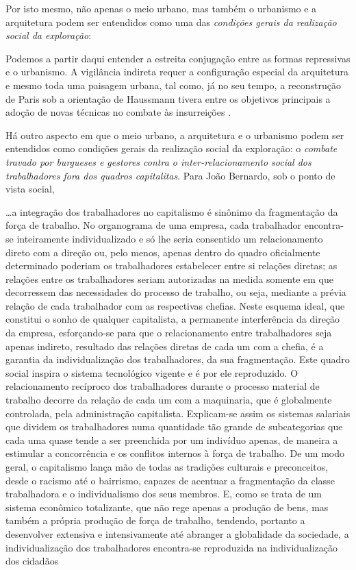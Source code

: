 Por isto mesmo, não apenas o meio urbano, mas também o urbanismo e a arquitetura podem ser entendidos como uma das \textit{condições gerais da realização social da exploração}:

\begin{citacao}
Podemos a partir daqui entender a estreita conjugação entre as formas repressivas e o urbanismo. A vigilância indireta requer a configuração especial da arquitetura e mesmo toda uma paisagem urbana, tal como, já no seu tempo, a reconstrução de Paris sob a orientação de Haussmann tivera entre os objetivos principais a adoção de novas técnicas no combate às insurreições \cite[p.~160]{BERNARDO1991}.
\end{citacao}

Há outro aspecto em que o meio urbano, a arquitetura e o urbanismo podem ser entendidos como condições gerais da realização social da exploração: o \textit{combate travado por burgueses e gestores contra o inter-relacionamento social dos trabalhadores fora dos quadros capitalitas}. Para João Bernardo, sob o ponto de vista social,

\begin{citacao}
\dots a integração dos trabalhadores no capitalismo é sinônimo da fragmentação da força de trabalho. No organograma de uma empresa, cada trabalhador encontra-se inteiramente individualizado e só lhe seria consentido um relacionamento direto com a direção ou, pelo menos, apenas dentro do quadro oficialmente determinado poderiam os trabalhadores estabelecer entre si relações diretas; as relações entre os trabalhadores seriam autorizadas na medida somente em que decorressem das necessidades do processo de trabalho, ou seja, mediante a prévia relação de cada trabalhador com as respectivas chefias. Neste esquema ideal, que constitui o sonho de qualquer capitalista, a permanente interferência da direção da empresa, esforçando-se para que o relacionamento entre trabalhadores seja apenas indireto, resultado das relações diretas de cada um com a chefia, é a garantia da individualização dos trabalhadores, da sua fragmentação. Este quadro social inspira o sistema tecnológico vigente e é por ele reproduzido. O relacionamento recíproco dos trabalhadores durante o processo material de trabalho decorre da relação de cada um com a maquinaria, que é globalmente controlada, pela administração capitalista. Explicam-se assim os sistemas salariais que dividem os trabalhadores numa quantidade tão grande de subcategorias que cada uma quase tende a ser preenchida por um indivíduo apenas, de maneira a estimular a concorrência e os conflitos internos à força de trabalho. De um modo geral, o capitalismo lança mão de todas as  tradições culturais e preconceitos, desde o racismo até o bairrismo, capazes de acentuar a fragmentação da classe trabalhadora e o individualismo dos seus membros. E, como se trata de um sistema econômico totalizante, que não rege apenas a produção de bens, mas também a própria produção de força de trabalho, tendendo, portanto a desenvolver extensiva e intensivamente até abranger a globalidade da sociedade, a individualização dos trabalhadores encontra-se reproduzida na individualização dos cidadãos \cite[p.~317]{BERNARDO1991}
\end{citacao}

